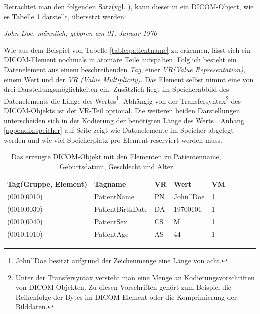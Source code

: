 Betrachtet man den folgenden Satz(vgl. \cite[S.46]{pianykh:dicom}), kann dieser in ein DICOM-Object, wie es Tabelle \ref*{table:translation} darstellt, übersetzt werden:
\begin{center}
\textit{\glqq John Doe, männlich, geboren am 01. Januar 1970\grqq}
\end{center}
Wie aus dem Beispiel von Tabelle \ref{table:patientname} zu erkennen, lässt sich ein DICOM-Element nochmals in atomare Teile aufspalten. Folglich besteht ein Datenelement aus einem beschreibenden \textit{Tag}, einer \textit{VR(Value Representation)}, einem Wert und der \textit{VR (Value Multiplicity)}. Das Element selbst nimmt eine von drei Darstellungsmöglichkeiten ein. Zusätzlich liegt im Speicherabbild des Datenelements die Länge des Wertes\footnote{John\^{}Doe besitzt aufgrund der Zeichenmenge eine Länge von acht.}. Abhängig von der Transfersyntax\footnote{Unter der Transfersyntax versteht man eine Menge an Kodierungsvorschriften von DICOM-Objekten\cite[S.63 Section 10]{dicom:structure}. Zu diesen Vorschriften gehört zum Beispiel die Reihenfolge der Bytes im DICOM-Element oder die Komprimierung der Bilddaten.} des DICOM-Objekts ist der VR-Teil optional. Die weiteren beiden Darstellungen unterscheiden sich in der Kodierung der benötigten Länge des Werts \cite[7.1]{dicom:structure}.  Anhang \ref{appendix:speicher} auf Seite \pageref{appendix:speicher} zeigt wie Datenelemente im Speicher abgelegt werden und wie viel Speicherplatz pro Element reserviert werden muss.

\begin{table}
    \begin{tabularx}{\textwidth}{|p{4cm}|p{4cm}|X|X|X|}
    \toprule
    \hline
    \textbf{Tag\newline \small{(Gruppe, Element)}}         & \textbf{Tagname}     & \textbf{VR} & \textbf{Wert}     	& \textbf{VM} \\ \hline
    (0010,0010) 		 & PatientName 			& PN 		  & John\^{}Doe 		& 1  \\ \hline
    (0010,0030) 		 & PatientBirthDate		& DA 		  & 19700101	 		& 1  \\ \hline
    (0010,0040)			 & PatientSex 			& CS 		  & M			 		& 1  \\ \hline
    (0010,1010) 		 & PatientAge 			& AS 		  & 44			 		& 1  \\ \hline
    \bottomrule
    \end{tabularx}
    \caption {Das erzeugte DICOM-Objekt mit den Elementen zu Patientenname, Geburtsdatum, Geschlecht und Alter}
    \label{table:translation}
\end{table}

